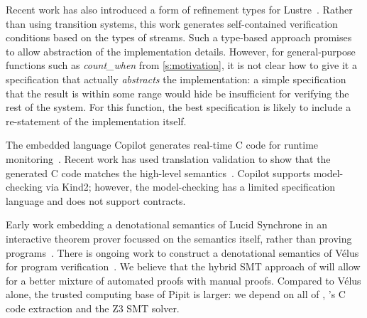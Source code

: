 Recent work has also introduced a form of refinement types for Lustre~\cite{chen2022synchronous}.
Rather than using transition systems, this work generates self-contained verification conditions based on the types of streams.
Such a type-based approach promises to allow abstraction of the implementation details.
However, for general-purpose functions such as \emph{count_when} from \autoref{s:motivation}, it is not clear how to give it a specification that actually \emph{abstracts} the implementation: a simple specification that the result is within some range would hide be insufficient for verifying the rest of the system.
For this function, the best specification is likely to include a re-statement of the implementation itself.

The embedded language Copilot generates real-time C code for runtime monitoring~\cite{laurent2015assuring}.
Recent work has used translation validation to show that the generated C code matches the high-level semantics~\cite{scott2023trustworthy}.
Copilot supports model-checking via Kind2; however, the model-checking has a limited specification language and does not support contracts.

Early work embedding a denotational semantics of Lucid Synchrone in an interactive theorem prover focussed on the semantics itself, rather than proving programs~\cite{boulme2001clocked}.
There is ongoing work to construct a denotational semantics of Vélus for program verification~\cite{bourke2022towards}.
We believe that the hybrid SMT approach of \fstar{} will allow for a better mixture of automated proofs with manual proofs.
Compared to Vélus alone, the trusted computing base of Pipit is larger: we depend on all of \fstar{}, \lowstar{}'s C code extraction and the Z3 SMT solver.




